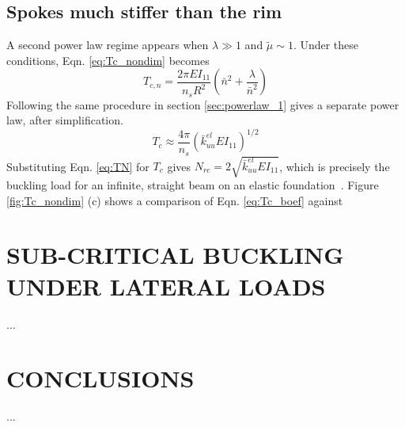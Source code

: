 \documentclass{bmd2016p}
\begin{document}
\subsection{Spokes much stiffer than the rim}
A second power law regime appears when $\lambda \gg 1$ and $\tilde{\mu} \sim 1$. Under these conditions, Eqn. \ref{eq:Tc_nondim} becomes
	\begin{equation}\label{eq:Tcn_boef}
	T_{c,n} = \frac{2\pi EI_{11}}{n_sR^2}\left(\bar{n}^2 + \frac{\lambda}{\bar{n}^2} \right)
	\end{equation}
Following the same procedure in section \ref{sec:powerlaw_1} gives a separate power law, after simplification.
	\begin{equation}\label{eq:Tc_boef}
	T_c \approx \frac{4\pi}{n_s} \left(\bar{k}_{uu}^{el}EI_{11} \right)^{1/2} 
	\end{equation}
Substituting Eqn. \ref{eq:TN} for $T_c$ gives $N_{rc}=2\sqrt{\bar{k}_{uu}^{el}EI_{11}}$, which is precisely the buckling load for an infinite, straight beam on an elastic foundation~\cite{Hetenyi1946a}. Figure \ref{fig:Tc_nondim} (c) shows a comparison of Eqn. \ref{eq:Tc_boef} against 



\section{SUB-CRITICAL BUCKLING UNDER LATERAL LOADS}
...



\section{CONCLUSIONS}
...





\end{document}
